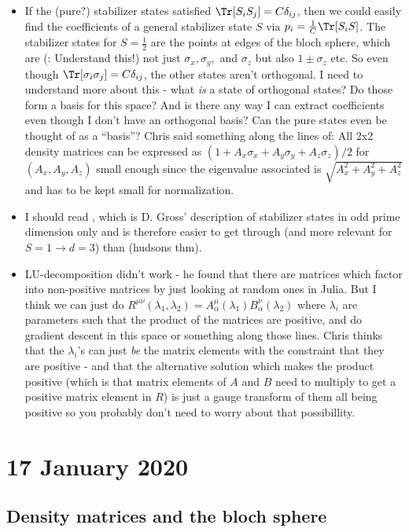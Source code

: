 \documentclass{report}
\begin{document}
 \begin{itemize}
 \item If the (pure?) stabilizer states satisfied $\Tr[S_iS_j]=C \delta_{ij}$, then we could easily find the coefficients of a general stabilizer state $S$ via $p_i=\frac{1}{C} \Tr[S_iS]$. The stabilizer states for $S=\frac{1}{2}$ are the points at edges of the bloch sphere, which are (\todo: Understand this!) not just $\sigma_x, \sigma_y,$ and $\sigma_z$ but also $1\pm \sigma_z$ etc. So even though $\Tr[\sigma_i\sigma_j]=C\delta_{ij}$, the other states aren't orthogonal. I need to understand more about this - what \textit{is} a state of orthogonal states? Do those form a basis for this space? And is there any way I can extract coefficients even though I don't have an orthogonal basis? Can the pure states even be thought of as a ``basis''? Chris said something along the lines of: All 2x2 density matrices can be expressed as $(1+A_x\sigma_x+A_y\sigma_y+A_z\sigma_z)/2$ for $(A_x,A_y,A_z)$ small enough since the eigenvalue associated is $\sqrt{A_x^2+A_y^2+A_z^2}$ and has to be kept small for normalization. 
 \item I should read \todo, which is D. Gross' description of stabilizer states in odd prime dimension only and is therefore easier to get through (and more relevant for $S=1\rightarrow d=3$) than \todo (hudsons thm).
 \item LU-decomposition didn't work - he found that there are matrices which factor into non-positive matrices by just looking at random ones in Julia. But I think we can just do $R^{\mu\nu}(\lambda_1,\lambda_2)=A^{\mu}_\alpha(\lambda_1)B^{\nu}_\alpha(\lambda_2)$ where $\lambda_i$ are parameters such that the product of the matrices are positive, and do gradient descent in this space or something along those lines. Chris thinks that the $\lambda_i$'s can just \textit{be} the matrix elements with the constraint that they are positive - and that the alternative solution which makes the product positive (which is that matrix elements  of $A$ and $B$ need to multiply to get a positive matrix element in $R$) is just a gauge transform of them all being positive so you probably don't need to worry about that possibillity. 
 \end{itemize}
 
 \chapter{17 January 2020}
 
 \section{Density matrices and the bloch sphere}
 
\end{document}
